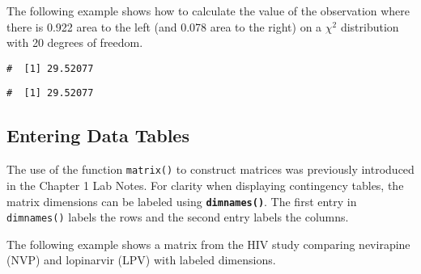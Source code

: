 \documentclass[letterpaper,12pt,twoside,]{pinp}
\begin{document}
The following example shows how to calculate the value of the
observation where there is 0.922 area to the left (and 0.078 area to the
right) on a \(\chi^2\) distribution with 20 degrees of freedom.

\begin{Shaded}
\begin{Highlighting}[]
\NormalTok{(}\NormalTok{, } \NormalTok{)}
\end{Highlighting}
\end{Shaded}

\begin{ShadedResult}
\begin{verbatim}
#  [1] 29.52077
\end{verbatim}
\end{ShadedResult}

\begin{Shaded}
\begin{Highlighting}[]
\NormalTok{(}\NormalTok{, } \NormalTok{, } \NormalTok{)}
\end{Highlighting}
\end{Shaded}

\begin{ShadedResult}
\begin{verbatim}
#  [1] 29.52077
\end{verbatim}
\end{ShadedResult}

\newpage

\hypertarget{entering-data-tables}{%
\subsection{Entering Data Tables}\label{entering-data-tables}}

The use of the function \texttt{matrix()} to construct matrices was
previously introduced in the Chapter 1 Lab Notes. For clarity when
displaying contingency tables, the matrix dimensions can be labeled
using \textbf{\texttt{dimnames()}}. The first entry in
\texttt{dimnames()} labels the rows and the second entry labels the
columns.

The following example shows a matrix from the HIV study comparing
nevirapine (NVP) and lopinarvir (LPV) with labeled dimensions.
\end{document}
